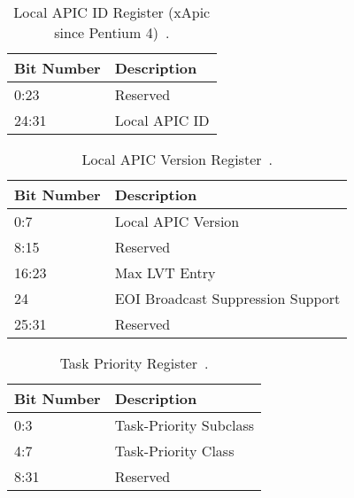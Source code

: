 \begin{table}[H]
  \centering
  \begin{tabularx}{1.0\textwidth}{| X | X |}
    \hline
    \textbf{Bit Number} & \textbf{Description} \\ \hline\hline
    0:23                & Reserved             \\ \hline
    24:31               & Local APIC ID        \\ \hline
  \end{tabularx}
  \caption{Local APIC ID Register (xApic since Pentium 4)~\cite[sec.~3.11.4.6]{ia32}.}
  \label{tab:lapicregsid}
\end{table}

\begin{table}[H]
  \centering
  \begin{tabularx}{1.0\textwidth}{| X | X |}
    \hline
    \textbf{Bit Number} & \textbf{Description}              \\ \hline\hline
    0:7                 & Local APIC Version                \\ \hline
    8:15                & Reserved                          \\ \hline
    16:23               & Max LVT Entry                     \\ \hline
    24                  & EOI Broadcast Suppression Support \\ \hline
    25:31               & Reserved                          \\ \hline
  \end{tabularx}
  \caption{Local APIC Version Register~\cite[sec.~3.11.4.8]{ia32}.}
  \label{tab:lapicregsver}
\end{table}

\begin{table}[H]
  \centering
  \begin{tabularx}{1.0\textwidth}{| X | X |}
    \hline
    \textbf{Bit Number} & \textbf{Description}   \\ \hline\hline
    0:3                 & Task-Priority Subclass \\ \hline
    4:7                 & Task-Priority Class    \\ \hline
    8:31                & Reserved               \\ \hline
  \end{tabularx}
  \caption{Task Priority Register~\cite[sec.~3.11.8.3.1]{ia32}.}
  \label{tab:lapicregstpr}
\end{table}

